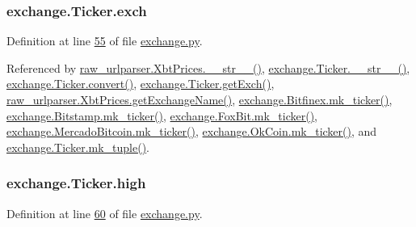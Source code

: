 \subsubsection[{\texorpdfstring{exch}{exch}}]{\setlength{\rightskip}{0pt plus 5cm}exchange.\+Ticker.\+exch}\hypertarget{classexchange_1_1_ticker_a33f33fe9a12da3ce52938afdc577c061}{}\label{classexchange_1_1_ticker_a33f33fe9a12da3ce52938afdc577c061}


Definition at line \hyperlink{exchange_8py_source_l00055}{55} of file \hyperlink{exchange_8py_source}{exchange.\+py}.



Referenced by \hyperlink{raw__urlparser_8py_source_l00074}{raw\+\_\+urlparser.\+Xbt\+Prices.\+\_\+\+\_\+str\+\_\+\+\_\+()}, \hyperlink{exchange_8py_source_l00111}{exchange.\+Ticker.\+\_\+\+\_\+str\+\_\+\+\_\+()}, \hyperlink{exchange_8py_source_l00065}{exchange.\+Ticker.\+convert()}, \hyperlink{exchange_8py_source_l00087}{exchange.\+Ticker.\+get\+Exch()}, \hyperlink{raw__urlparser_8py_source_l00068}{raw\+\_\+urlparser.\+Xbt\+Prices.\+get\+Exchange\+Name()}, \hyperlink{exchange_8py_source_l00354}{exchange.\+Bitfinex.\+mk\+\_\+ticker()}, \hyperlink{exchange_8py_source_l00423}{exchange.\+Bitstamp.\+mk\+\_\+ticker()}, \hyperlink{exchange_8py_source_l00482}{exchange.\+Fox\+Bit.\+mk\+\_\+ticker()}, \hyperlink{exchange_8py_source_l00557}{exchange.\+Mercado\+Bitcoin.\+mk\+\_\+ticker()}, \hyperlink{exchange_8py_source_l00622}{exchange.\+Ok\+Coin.\+mk\+\_\+ticker()}, and \hyperlink{exchange_8py_source_l00096}{exchange.\+Ticker.\+mk\+\_\+tuple()}.

\subsubsection[{\texorpdfstring{high}{high}}]{\setlength{\rightskip}{0pt plus 5cm}exchange.\+Ticker.\+high}\hypertarget{classexchange_1_1_ticker_aace381ca15468df6a40e8d86b7710a7f}{}\label{classexchange_1_1_ticker_aace381ca15468df6a40e8d86b7710a7f}


Definition at line \hyperlink{exchange_8py_source_l00060}{60} of file \hyperlink{exchange_8py_source}{exchange.\+py}.



